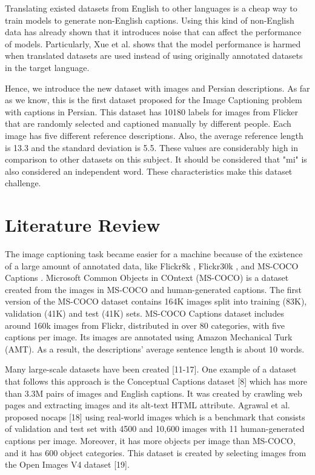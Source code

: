 \documentclass[10pt]{cai}
\begin{document}
Translating existed datasets from English to other languages is a cheap way to train models to generate non-English captions.
Using this kind of non-English data has already shown that it introduces noise that can affect the  performance of models.
Particularly, Xue et al. \cite{xue2020mt5} shows that the model performance is harmed when translated datasets are used instead of using originally annotated datasets in the target language.

Hence, we introduce the new dataset with images and Persian descriptions.
As far as we know, this is the first dataset proposed for the Image Captioning problem with captions in Persian.
This dataset has 10180 labels for images from Flicker that are randomly selected and captioned manually by different people.
Each image has five different reference descriptions. 
Also, the average reference length is 13.3 and the standard deviation is 5.5. 
These values are considerably high in comparison to other datasets on this subject.
It should be considered that "mi" is also considered an independent word. 
These characteristics make this dataset challenge. 

\section{Literature Review}
\label{literature}

The image captioning task became easier for a machine because of the existence of a large amount of annotated data, like Flickr8k \cite{hodosh2013framing}, Flickr30k \cite{plummer2015flickr30k}, and MS-COCO Captions \cite{chen2015microsoft}.
Microsoft Common Objects in COntext (MS-COCO) is a dataset created from the images in MS-COCO \cite{chen2015microsoft} and human-generated captions. 
The first version of the MS-COCO dataset contains 164K images split into training (83K), validation (41K) and test (41K) sets. 
MS-COCO Captions dataset includes around 160k images from Flickr, distributed in over 80 categories, with five captions per image. 
Its images are annotated using Amazon Mechanical Turk (AMT). 
As a result, the descriptions’ average sentence length is about 10 words.

Many large-scale datasets have been created [11-17]. 
One example of a dataset that follows this approach is the Conceptual Captions dataset [8] which has more than 3.3M pairs of images and English captions. 
It was created by crawling web pages and extracting images and its alt-text HTML attribute. 
Agrawal et al. proposed nocaps [18] using real-world images which is a benchmark that consists of validation and test set with 4500 and 10,600 images with 11 human-generated captions per image. 
Moreover, it has more objects per image than MS-COCO, and it has 600 object categories. 
This dataset is created by selecting images from the Open Images V4 dataset [19]. 
\end{document}
